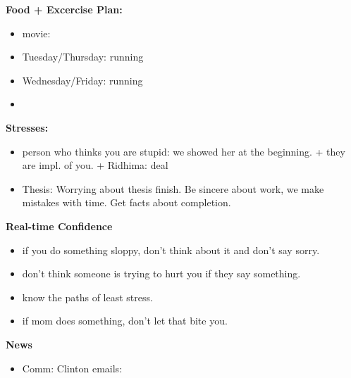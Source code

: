 \documentclass[11pt]{article}
\begin{document}
{  \textbf{Food + Excercise Plan:}\\
  \begin{itemize} 
  \item \tiny movie: 
    \tiny \item \tiny Tuesday/Thursday: running 
  \item \tiny Wednesday/Friday: running 
  \item \tiny 
  \end{itemize}
            \textbf{Stresses:}\\
            \begin{itemize} 
            \item \tiny person who thinks you are stupid:  we
              showed her at the beginning.  + they are impl. of you. +
               Ridhima: deal 
            \item \tiny Thesis:  Worrying about thesis finish. Be
              sincere about work, we make mistakes with time. Get
              facts about completion.
            \end{itemize}
            
            \textbf{Real-time Confidence}\\
            \begin{itemize}
              \tiny \item \tiny if you do something sloppy, don't
              think about it and don't say sorry.
            \item \tiny don't think someone is trying to hurt you if
              they say something.
            \item \tiny know the paths of least stress.
            \item \tiny if mom does something, don't let that bite
              you. 
            \end{itemize} 
            \textbf{News} 
            \begin{itemize}
            \item \tiny Comm: Clinton emails: 
            \end{itemize} 
    
}
\end{document}
